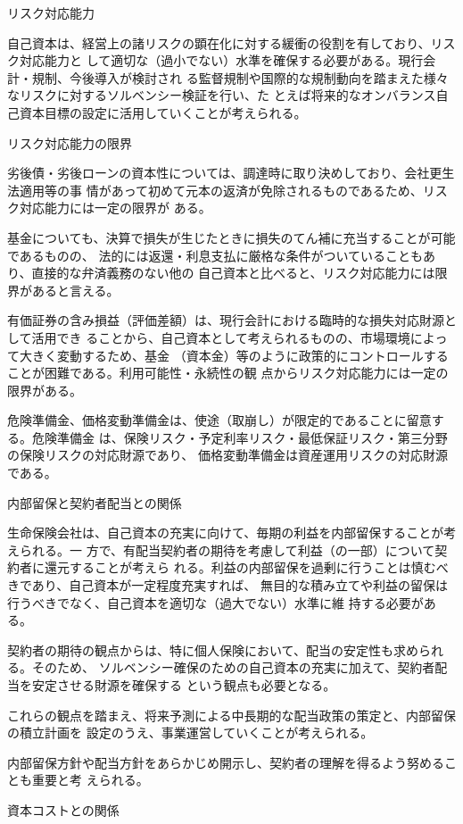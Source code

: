 \documentclass[report,gutter=10mm,fore-edge=10mm,uplatex,dvipdfmx]{jlreq}
\begin{document}
リスク対応能力

自己資本は、経営上の諸リスクの顕在化に対する緩衝の役割を有しており、リスク対応能力と
して適切な（過小でない）水準を確保する必要がある。現行会計・規制、今後導入が検討され
る監督規制や国際的な規制動向を踏まえた様々なリスクに対するソルベンシー検証を行い、た
とえば将来的なオンバランス自己資本目標の設定に活用していくことが考えられる。

リスク対応能力の限界

劣後債・劣後ローンの資本性については、調達時に取り決めしており、会社更生法適用等の事
情があって初めて元本の返済が免除されるものであるため、リスク対応能力には一定の限界が
ある。

基金についても、決算で損失が生じたときに損失のてん補に充当することが可能であるものの、
法的には返還・利息支払に厳格な条件がついていることもあり、直接的な弁済義務のない他の
自己資本と比べると、リスク対応能力には限界があると言える。

有価証券の含み損益（評価差額）は、現行会計における臨時的な損失対応財源として活用でき
ることから、自己資本として考えられるものの、市場環境によって大きく変動するため、基金
（資本金）等のように政策的にコントロールすることが困難である。利用可能性・永続性の観
点からリスク対応能力には一定の限界がある。

危険準備金、価格変動準備金は、使途（取崩し）が限定的であることに留意する。危険準備金
は、保険リスク・予定利率リスク・最低保証リスク・第三分野の保険リスクの対応財源であり、
価格変動準備金は資産運用リスクの対応財源である。

内部留保と契約者配当との関係

生命保険会社は、自己資本の充実に向けて、毎期の利益を内部留保することが考えられる。一
方で、有配当契約者の期待を考慮して利益（の一部）について契約者に還元することが考えら
れる。利益の内部留保を過剰に行うことは慎むべきであり、自己資本が一定程度充実すれば、
無目的な積み立てや利益の留保は行うべきでなく、自己資本を適切な（過大でない）水準に維
持する必要がある。

契約者の期待の観点からは、特に個人保険において、配当の安定性も求められる。そのため、
ソルベンシー確保のための自己資本の充実に加えて、契約者配当を安定させる財源を確保する
という観点も必要となる。

これらの観点を踏まえ、将来予測による中長期的な配当政策の策定と、内部留保の積立計画を
設定のうえ、事業運営していくことが考えられる。

内部留保方針や配当方針をあらかじめ開示し、契約者の理解を得るよう努めることも重要と考
えられる。

資本コストとの関係
\end{document}
